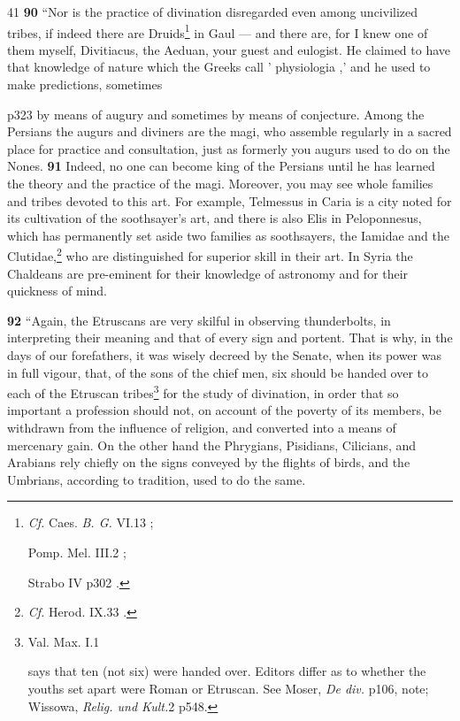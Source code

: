 41
\textbf{90} ``Nor is the practice of divination disregarded even among uncivilized tribes, if indeed there are Druids\texthebrew{}\footnote{\emph{Cf.} Caes. \emph{B. G.} VI.13 ;

Pomp. Mel. III.2 ;

Strabo IV p302 .

} in Gaul \texthebrew{—} and there are, for I knew one of them myself, Divitiacus, the Aeduan, your guest and eulogist. He claimed to have that knowledge of nature which the Greeks call ' physiologia ,' and he used to make predictions, sometimes

p323 by means of augury and sometimes by means of conjecture. Among the Persians the augurs and diviners are the magi, who assemble regularly in a sacred place for practice and consultation, just as formerly you augurs used to do on the Nones. \textbf{91} Indeed, no one can become king of the Persians until he has learned the theory and the practice of the magi. Moreover, you may see whole families and tribes devoted to this art. For example, Telmessus in Caria is a city noted for its cultivation of the soothsayer's art, and there is also Elis in Peloponnesus, which has permanently set aside two families as soothsayers, the Iamidae and the Clutidae,\texthebrew{}\footnote{\emph{Cf.} Herod. IX.33 .

} who are distinguished for superior skill in their art. In Syria the Chaldeans are pre-eminent for their knowledge of astronomy and for their quickness of mind.

\textbf{92} ``Again, the Etruscans are very skilful in observing thunderbolts, in interpreting their meaning and that of every sign and portent. That is why, in the days of our forefathers, it was wisely decreed by the Senate, when its power was in full vigour, that, of the sons of the chief men, six should be handed over to each of the Etruscan tribes\texthebrew{}\footnote{Val. Max. I.1

says that ten (not six) were handed over. Editors differ as to whether the youths set apart were Roman or Etruscan. See Moser, \emph{De div.} p106, note; Wissowa, \emph{Relig. und Kult.}2 p548.

} for the study of divination, in order that so important a profession should not, on account of the poverty of its members, be withdrawn from the influence of religion, and converted into a means of mercenary gain. On the other hand the Phrygians, Pisidians, Cilicians, and Arabians rely chiefly on the signs conveyed by the flights of birds, and the Umbrians, according to tradition, used to do the same.

